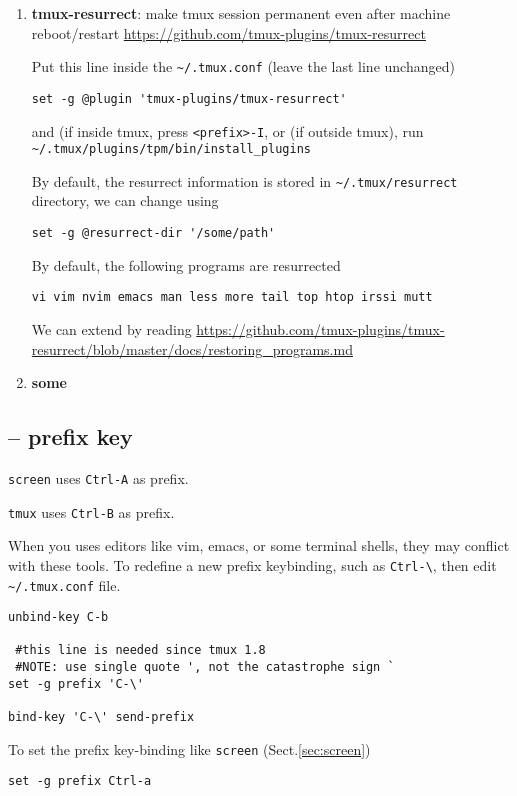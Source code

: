 \begin{enumerate}

  \item {\bf tmux-resurrect}: make tmux session permanent even after machine reboot/restart
  \url{https://github.com/tmux-plugins/tmux-resurrect}
  
Put this line inside the \verb!~/.tmux.conf! (leave the last line unchanged)
  \begin{verbatim}
set -g @plugin 'tmux-plugins/tmux-resurrect'  
  \end{verbatim}
and (if inside tmux, press \verb!<prefix>-I!, or (if outside tmux), run
\verb!~/.tmux/plugins/tpm/bin/install_plugins!  

By default, the resurrect information is stored in \verb!~/.tmux/resurrect!
directory, we can change using
\begin{verbatim}
set -g @resurrect-dir '/some/path'
\end{verbatim}

By default, the following programs are resurrected
\begin{verbatim}
vi vim nvim emacs man less more tail top htop irssi mutt
\end{verbatim}
We can extend by reading 
\url{https://github.com/tmux-plugins/tmux-resurrect/blob/master/docs/restoring_programs.md}

  \item {\bf some }
\end{enumerate}

\subsection{-- prefix key}

\verb!screen! uses \verb!Ctrl-A! as prefix.

\verb!tmux! uses \verb!Ctrl-B! as prefix.

When you uses editors like vim, emacs, or some terminal shells, they may
conflict with these tools. To redefine a new prefix keybinding, such as
\verb!Ctrl-\!, then edit \verb!~/.tmux.conf! file.

\begin{verbatim}
unbind-key C-b

 #this line is needed since tmux 1.8
 #NOTE: use single quote ', not the catastrophe sign `
set -g prefix 'C-\'

bind-key 'C-\' send-prefix
\end{verbatim}

To set the prefix key-binding like \verb!screen! (Sect.\ref{sec:screen})
\begin{verbatim}
set -g prefix Ctrl-a
\end{verbatim}

